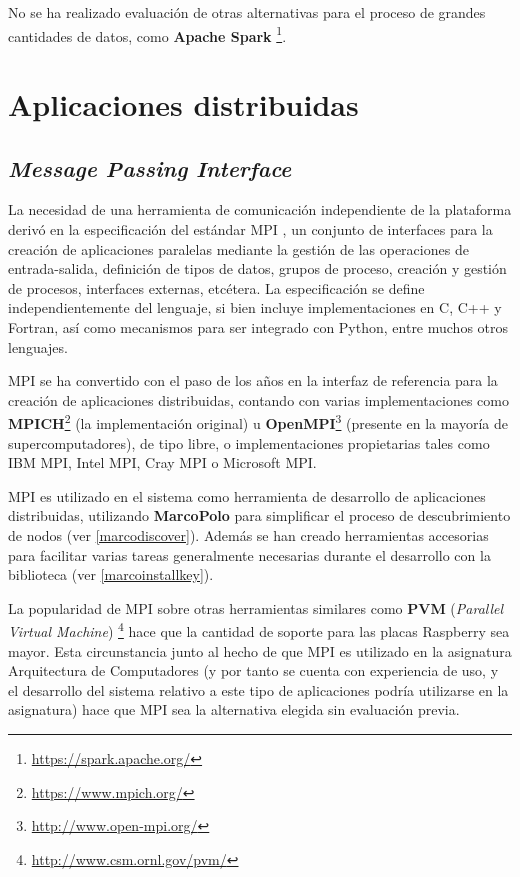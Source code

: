 No se ha realizado evaluación de otras alternativas para el proceso de grandes cantidades de datos, como \textbf{Apache Spark} \footnote{\href{https://spark.apache.org/}{https://spark.apache.org/}}.

\section{Aplicaciones distribuidas}

\subsection{\textit{Message Passing Interface}}

La necesidad de una herramienta de comunicación independiente de la plataforma derivó en la especificación del estándar MPI \cite{MPISpec}, un conjunto de interfaces para la creación de aplicaciones paralelas mediante la gestión de las operaciones de entrada-salida, definición de tipos de datos, grupos de proceso, creación y gestión de procesos, interfaces externas, etcétera. La especificación se define independientemente del lenguaje, si bien incluye implementaciones en C, C++ y Fortran, así como mecanismos para ser integrado con Python, entre muchos otros lenguajes.

MPI se ha convertido con el paso de los años en la interfaz de referencia para la creación de aplicaciones distribuidas, contando con varias implementaciones como \textbf{MPICH}\footnote{\href{https://www.mpich.org/}{https://www.mpich.org/}} (la implementación original) u \textbf{OpenMPI}\footnote{\href{http://www.open-mpi.org/}{http://www.open-mpi.org/}} (presente en la mayoría de supercomputadores), de tipo libre, o implementaciones propietarias tales como IBM MPI, Intel MPI, Cray MPI o Microsoft MPI.

MPI es utilizado en el sistema como herramienta de desarrollo de aplicaciones distribuidas, utilizando \textbf{MarcoPolo} para simplificar el proceso de descubrimiento de nodos (ver \ref{marcodiscover}). Además se han creado herramientas accesorias para facilitar varias tareas generalmente necesarias durante el desarrollo con la biblioteca (ver \ref{marcoinstallkey}).

La popularidad de MPI sobre otras herramientas similares como \textbf{PVM} (\textit{Parallel Virtual Machine}) \footnote{\href{http://www.csm.ornl.gov/pvm/}{http://www.csm.ornl.gov/pvm/}} hace que la cantidad de soporte para las placas Raspberry sea mayor. Esta circunstancia junto al hecho de que MPI es utilizado en la asignatura Arquitectura de Computadores (y por tanto se cuenta con experiencia de uso, y el desarrollo del sistema relativo a este tipo de aplicaciones podría utilizarse en la asignatura) hace que MPI sea la alternativa elegida sin evaluación previa.


